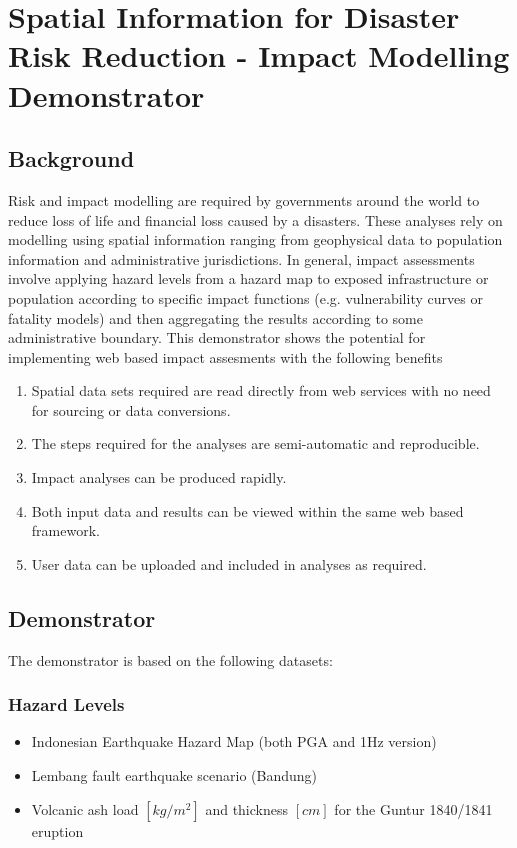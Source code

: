 \documentclass[a4paper]{article}
\begin{document}
\section*{Spatial Information for Disaster Risk Reduction - Impact Modelling Demonstrator}

\subsection*{Background}

Risk and impact modelling are required by governments around the world to reduce loss of life and financial loss caused by a disasters. These analyses rely on modelling using spatial information ranging from geophysical data to population information and administrative jurisdictions.
In general, impact assessments involve applying hazard levels from a hazard map to exposed infrastructure or population according to specific impact functions (e.g. vulnerability curves or fatality models) and then aggregating the results according to some administrative boundary. 
This demonstrator shows the potential for implementing web based impact assesments with the following benefits
\begin{enumerate}
  \item Spatial data sets required are read directly from web services with no need for sourcing or data conversions.
  \item The steps required for the analyses are semi-automatic and reproducible.
  \item Impact analyses can be produced rapidly.
  \item Both input data and results can be viewed within the same web based framework.
  \item User data can be uploaded and included in analyses as required.
\end{enumerate} 

\subsection*{Demonstrator}

The demonstrator is based on the following datasets:
\subsubsection*{Hazard Levels}
\begin{itemize} 
  \item Indonesian Earthquake Hazard Map (both PGA and 1Hz version)
  \item Lembang fault earthquake scenario (Bandung)
  \item Volcanic ash load $[kg/m^2]$ and thickness $[cm]$ for the Guntur 1840/1841 eruption 
\end{itemize}   
  
\end{document}
